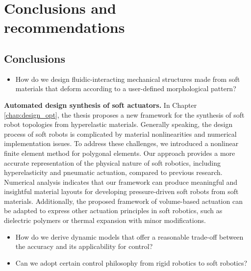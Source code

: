 \chapter[Conclusions and recommendations]{Conclusions and \\ recommendations}
\label{chap: conclusions}
\thispagestyle{empty}

\section{Conclusions}

\begin{itemize}
  \setlength\itemsep{-.1em}
  \item {How do we design fluidic-interacting mechanical structures made from soft materials that deform according to a user-defined morphological pattern?}
\end{itemize}

\noindent \textbf{Automated design synthesis of soft actuators. } In Chapter \ref{chap:design_opt}, the thesis proposes a new framework for the synthesis of soft robot topologies from hyperelastic materials. Generally speaking, the design process of soft robots is complicated by material nonlinearities and numerical implementation issues. To address these challenges, we introduced a nonlinear finite element method for polygonal elements. Our approach provides a more accurate representation of the physical nature of soft robotics, including hyperelasticity and pneumatic actuation, compared to previous research. Numerical analysis indicates that our framework can produce meaningful and insightful material layouts for developing pressure-driven soft robots from soft materials. Additionally, the proposed framework of volume-based actuation can be adapted to express other actuation principles in soft robotics, such as dielectric polymers or thermal expansion with minor modifications.

\begin{itemize}
  \setlength\itemsep{-.1em}
  \item {How do we derive dynamic models that offer a reasonable trade-off between the accuracy and its applicability for control?}
  \item {Can we adopt certain control philosophy from rigid robotics to soft robotics?} 
\end{itemize}

